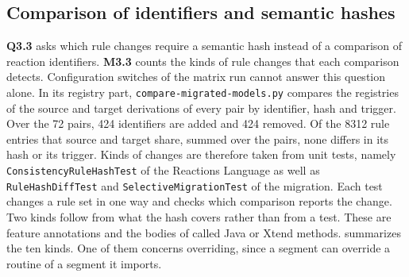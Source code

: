 \subsection{Comparison of identifiers and semantic hashes}
\label{sec:Evaluation:InconsistencyIdentification:ComparisonOfIdentifiersAndSemanticHashes}

\textbf{Q3.3} asks which rule changes require a semantic hash instead of a comparison of reaction identifiers.
\textbf{M3.3} counts the kinds of rule changes that each comparison detects.
Configuration switches of the matrix run cannot answer this question alone.
In its registry part, \texttt{compare-migrated-models.py} compares the registries of the source and target derivations of every pair by identifier, hash and trigger.
Over the 72 pairs, 424 identifiers are added and 424 removed.
Of the 8312 rule entries that source and target share, summed over the pairs, none differs in its hash or its trigger.
Kinds of changes are therefore taken from unit tests, namely \texttt{ConsistencyRuleHashTest} of the Reactions Language as well as \texttt{RuleHashDiffTest} and \texttt{SelectiveMigrationTest} of the migration.
Each test changes a rule set in one way and checks which comparison reports the change.
Two kinds follow from what the hash covers rather than from a test.
These are feature annotations and the bodies of called Java or Xtend methods.
 summarizes the ten kinds.
One of them concerns overriding, since a segment can override a routine of a segment it imports.

